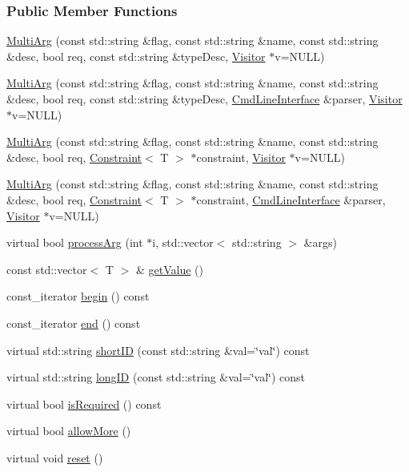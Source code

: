 \subsubsection*{Public Member Functions}
\begin{DoxyCompactItemize}
\item 
\hyperlink{classTCLAP_1_1MultiArg_a49b5437c7f06cd6864c07dc59814a953}{Multi\+Arg} (const std\+::string \&flag, const std\+::string \&name, const std\+::string \&desc, bool req, const std\+::string \&type\+Desc, \hyperlink{classTCLAP_1_1Visitor}{Visitor} $\ast$v=N\+U\+LL)
\item 
\hyperlink{classTCLAP_1_1MultiArg_a48c90a873389280f72fb5d6ef707b400}{Multi\+Arg} (const std\+::string \&flag, const std\+::string \&name, const std\+::string \&desc, bool req, const std\+::string \&type\+Desc, \hyperlink{classTCLAP_1_1CmdLineInterface}{Cmd\+Line\+Interface} \&parser, \hyperlink{classTCLAP_1_1Visitor}{Visitor} $\ast$v=N\+U\+LL)
\item 
\hyperlink{classTCLAP_1_1MultiArg_a38b1e32a8189356bd1e5ec7c2d43c1a3}{Multi\+Arg} (const std\+::string \&flag, const std\+::string \&name, const std\+::string \&desc, bool req, \hyperlink{classTCLAP_1_1Constraint}{Constraint}$<$ T $>$ $\ast$constraint, \hyperlink{classTCLAP_1_1Visitor}{Visitor} $\ast$v=N\+U\+LL)
\item 
\hyperlink{classTCLAP_1_1MultiArg_ad4fcd892de2f1ef275c30dc499215208}{Multi\+Arg} (const std\+::string \&flag, const std\+::string \&name, const std\+::string \&desc, bool req, \hyperlink{classTCLAP_1_1Constraint}{Constraint}$<$ T $>$ $\ast$constraint, \hyperlink{classTCLAP_1_1CmdLineInterface}{Cmd\+Line\+Interface} \&parser, \hyperlink{classTCLAP_1_1Visitor}{Visitor} $\ast$v=N\+U\+LL)
\item 
virtual bool \hyperlink{classTCLAP_1_1MultiArg_a344d3cf2128c510f92825e421ea667c7}{process\+Arg} (int $\ast$i, std\+::vector$<$ std\+::string $>$ \&args)
\item 
const std\+::vector$<$ T $>$ \& \hyperlink{classTCLAP_1_1MultiArg_aff4ff7f8d854dd668aaaf80511d8002b}{get\+Value} ()
\item 
const\+\_\+iterator \hyperlink{classTCLAP_1_1MultiArg_a48058500cdc9ef8b9c2c9e6394ab499d}{begin} () const 
\item 
const\+\_\+iterator \hyperlink{classTCLAP_1_1MultiArg_ac30e414b799158ff6710fb1e7ce83aee}{end} () const 
\item 
virtual std\+::string \hyperlink{classTCLAP_1_1MultiArg_ac2c962112704b899f4c8b8565f2c4bb3}{short\+ID} (const std\+::string \&val=\char`\"{}val\char`\"{}) const 
\item 
virtual std\+::string \hyperlink{classTCLAP_1_1MultiArg_a16c00fbce6876bceabb3dab4723f7e79}{long\+ID} (const std\+::string \&val=\char`\"{}val\char`\"{}) const 
\item 
virtual bool \hyperlink{classTCLAP_1_1MultiArg_a3cb7fec92f3d70e0e455c6bc33fbebab}{is\+Required} () const 
\item 
virtual bool \hyperlink{classTCLAP_1_1MultiArg_ab05097627c81cd65975fa1b99fae9bd0}{allow\+More} ()
\item 
virtual void \hyperlink{classTCLAP_1_1MultiArg_ab21f01f22978a1c0eea716399e9ff89b}{reset} ()
\end{DoxyCompactItemize}
